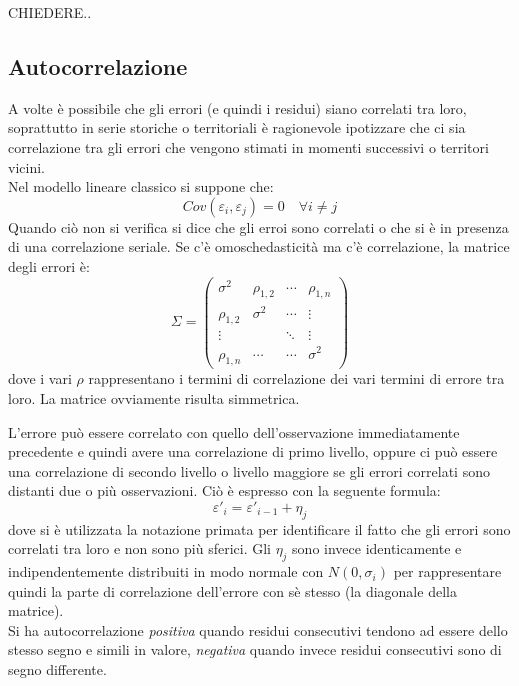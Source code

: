 \documentclass[]{article}
\begin{document}
CHIEDERE..

\subsection{Autocorrelazione}
A volte è possibile che gli errori (e quindi i residui) siano correlati tra loro, soprattutto in serie storiche o territoriali è ragionevole ipotizzare che ci sia correlazione tra gli errori che vengono stimati in momenti successivi o territori vicini.\\
Nel modello lineare classico si suppone che:
\begin{equation}
	Cov(\varepsilon_i, \varepsilon_j) = 0 \quad \forall i \neq j
\end{equation}
Quando ciò non si verifica si dice che gli erroi sono correlati o che si è in presenza di una correlazione seriale. Se c'è omoschedasticità ma c'è correlazione, la matrice degli errori è:
\begin{equation}
	\Sigma = \begin{pmatrix}
	\sigma^2 & \rho_{1,2} & \cdots & \rho_{1,n} \\ 
	\rho_{1,2} & \sigma^2 & \cdots & \vdots \\ 
	\vdots &  & \ddots & \vdots \\ 
	\rho_{1,n} & \cdots & \cdots & \sigma^2
	\end{pmatrix} 
\end{equation}
dove i vari $\rho$ rappresentano i termini di correlazione dei vari termini di errore tra loro. La matrice ovviamente risulta simmetrica.

L'errore può essere correlato con quello dell'osservazione immediatamente precedente e quindi avere una correlazione di primo livello, oppure ci può essere una correlazione di secondo livello o livello maggiore se gli errori correlati sono distanti due o più osservazioni. Ciò è espresso con la seguente formula:
\begin{equation}
	\varepsilon'_i = \varepsilon'_{i-1} + \eta_j
\end{equation}
dove si è utilizzata la notazione primata per identificare il fatto che gli errori sono correlati tra loro e non sono più sferici. Gli $\eta_j$ sono invece identicamente e indipendentemente distribuiti in modo normale con $N(0,\sigma_i)$ per rappresentare quindi la parte di correlazione dell'errore con sè stesso (la diagonale della matrice).\\
Si ha autocorrelazione \textit{positiva} quando residui consecutivi tendono ad essere dello stesso segno e simili in valore, \textit{negativa} quando invece residui consecutivi sono di segno differente.
\end{document}
